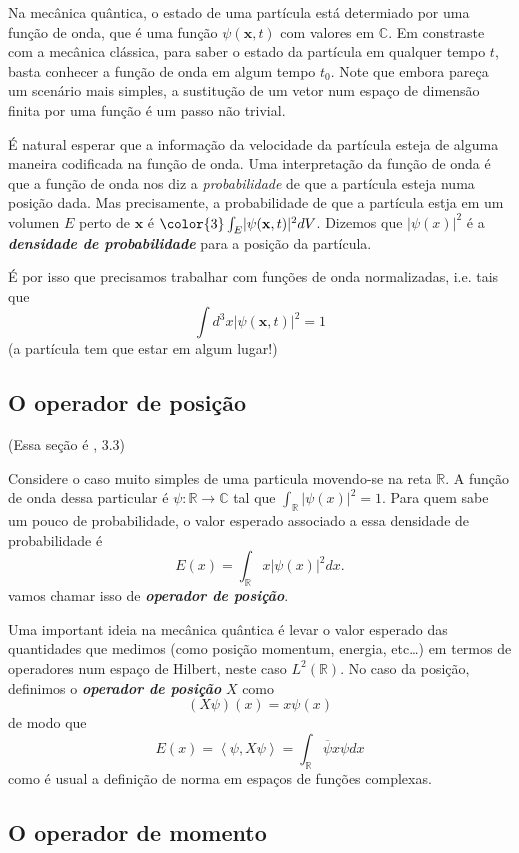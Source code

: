 Na mecânica quântica, o estado de uma partícula está determiado por uma função de onda, que é uma função $\psi(\mathbf{x},t)$ com valores em $\mathbb{C}$. Em constraste com a mecânica clássica, para saber o estado da partícula em qualquer tempo $t$,  basta conhecer a função de onda em algum tempo $t_0$. Note que embora pareça um scenário mais simples, a sustitução de um vetor num espaço de dimensão finita por uma função é um passo não trivial.

É natural esperar que a informação da velocidade da partícula esteja de alguma maneira codificada na função de onda. Uma interpretação da função de onda é que a função de onda nos diz a \textit{probabilidade} de que a partícula esteja numa posição dada. Mas precisamente, a probabilidade de que a partícula estja em um volumen $E$ perto de  $\mathbf{x}$ é ${\color{3}\int_{E}}|\psi(\mathbf{x},t)|^2dV$. Dizemos que $|\psi(x)|^2$ é a \textit{\textbf{densidade de probabilidade}} para a posição da partícula.

É por isso que precisamos trabalhar com funções  de onda normalizadas, i.e. tais que
\[\int d^3x |\psi(\mathbf{x},t)|^2=1\]
(a partícula tem que estar em algum lugar!)

\subsection{O operador de posição}

(Essa seção é \cite{hallq}, 3.3)

Considere o caso muito simples de uma particula movendo-se na reta $\mathbb{R}$. A função de onda dessa particular é $\psi:\mathbb{R}\to \mathbb{C}$ tal que $\int_{\mathbb{R}}|\psi(x)|^2=1$. Para quem sabe um pouco de probabilidade, o valor esperado associado a essa densidade de probabilidade é
\[E(x)=\int_{\mathbb{R}}x |\psi(x)|^2dx.\]
vamos chamar isso de \textit{\textbf{operador de posição}}.

Uma important ideia na mecânica quântica é levar o valor esperado das quantidades que medimos (como posição momentum, energia, etc…) em termos de operadores num espaço de Hilbert, neste caso $L^2(\mathbb{R})$. No caso da posição, definimos o \textit{\textbf{operador de posição}} $X$ como
 \[(X\psi)(x)=x\psi(x)\]
 de modo que 
 \[E(x)=\left<\psi,X\psi\right> =\int_{\mathbb{R}}\overline{\psi}x\psi dx\]
 como é usual a definição de norma em espaços de funções complexas.

\subsection{O operador de momento}

